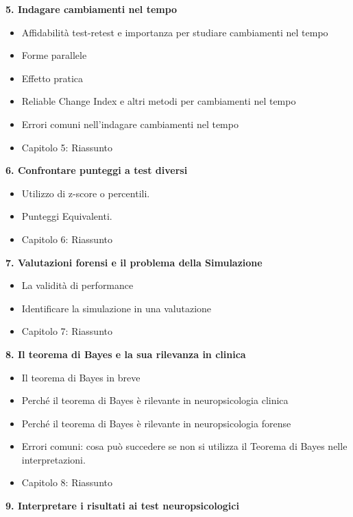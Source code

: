 \documentclass[
  italian,
  letterpaper,
  paper=6in:9in,
  pagesize=pdftex,
  headinclude=on,
  footinclude=on,
  11pt]{scrbook}
\providecommand{\tightlist}{%
  \setlength{\itemsep}{0pt}\setlength{\parskip}{0pt}}
\begin{document}
\textbf{5. Indagare cambiamenti nel tempo}

\begin{itemize}
\tightlist
\item
  Affidabilità test-retest e importanza per studiare cambiamenti nel
  tempo
\item
  Forme parallele
\item
  Effetto pratica
\item
  Reliable Change Index e altri metodi per cambiamenti nel tempo
\item
  Errori comuni nell'indagare cambiamenti nel tempo
\item
  Capitolo 5: Riassunto
\end{itemize}

\textbf{6. Confrontare punteggi a test diversi}

\begin{itemize}
\tightlist
\item
  Utilizzo di z-score o percentili.
\item
  Punteggi Equivalenti.
\item
  Capitolo 6: Riassunto
\end{itemize}

\textbf{7. Valutazioni forensi e il problema della Simulazione}

\begin{itemize}
\tightlist
\item
  La validità di performance
\item
  Identificare la simulazione in una valutazione
\item
  Capitolo 7: Riassunto
\end{itemize}

\textbf{8. Il teorema di Bayes e la sua rilevanza in clinica}

\begin{itemize}
\tightlist
\item
  Il teorema di Bayes in breve
\item
  Perché il teorema di Bayes è rilevante in neuropsicologia clinica
\item
  Perché il teorema di Bayes è rilevante in neuropsicologia forense
\item
  Errori comuni: cosa può succedere se non si utilizza il Teorema di
  Bayes nelle interpretazioni.
\item
  Capitolo 8: Riassunto
\end{itemize}

\textbf{9. Interpretare i risultati ai test neuropsicologici}
\end{document}
